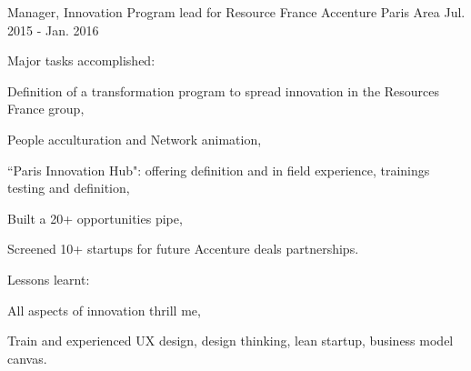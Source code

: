 \begin{cventries}
  \cventry
    {Manager, Innovation Program lead for Resource France} %
    {Accenture} %
    {Paris Area} %
    {Jul. 2015 - Jan. 2016} %
    {
      \begin{cvitems} %
        \item {Major tasks accomplished:}
        \begin{cvsubitems}
          \item {Definition of a transformation program to spread innovation in the Resources France group,}
          \item {People acculturation and Network animation,}
          \item {``Paris Innovation Hub": offering definition and in field experience, trainings testing and definition,}
          \item {Built a 20+ opportunities pipe,}
          \item {Screened 10+ startups for future Accenture deals partnerships.}
        \end{cvsubitems}
        \item {Lessons learnt:}
        \begin{cvsubitems}
          \item {All aspects of innovation thrill me,}
          \item {Train and experienced UX design, design thinking, lean startup, business model canvas.}
        \end{cvsubitems}
      \end{cvitems}
    }


\end{cventries}
